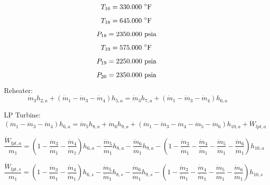 \documentclass{article}
\begin{document}
\begin{equation}
T_{16} =  330.000\textnormal{ \(^{\circ}\)F             }
\end{equation}

\begin{equation}
T_{18} =  645.000\textnormal{ \(^{\circ}\)F             }
\end{equation}

\begin{equation}
P_{18} = 2350.000\textnormal{ psia                      }
\end{equation}

\begin{equation}
T_{19} =  575.000\textnormal{ \(^{\circ}\)F             }
\end{equation}

\begin{equation}
P_{19} = 2250.000\textnormal{ psia                      }
\end{equation}

\begin{equation}
P_{20} = 2350.000\textnormal{ psia                      }
\end{equation}


Reheater:
\begin{equation}
\dot{m}_{ 3}h_{ 2,a} + (\dot{m}_{ 1} - \dot{m}_{ 3} - \dot{m}_{ 4})h_{ 5,a} = \dot{m}_{ 3}h_{ 7,a} + (\dot{m}_{ 1} - \dot{m}_{ 3} - \dot{m}_{ 4})h_{ 6,a}
\end{equation}


LP Turbine:
\begin{equation}
(\dot{m}_{ 1} - \dot{m}_{ 3} - \dot{m}_{ 4})h_{ 6,a} = \dot{m}_{ 5}h_{ 8,a} + \dot{m}_{ 6}h_{ 9,a} + (\dot{m}_{ 1} - \dot{m}_{ 3} - \dot{m}_{ 4} - \dot{m}_{ 5} - \dot{m}_{ 6})h_{10,a} + \dot{W}_{lpt,a}
\end{equation}

\begin{equation}
\frac{\dot{W}_{lpt,a}}{m_1} = (1 - \frac{\dot{m}_{ 3}}{\dot{m}_{ 1}} - \frac{\dot{m}_{ 4}}{\dot{m}_{ 1}})h_{ 6,a} - \frac{\dot{m}_{ 5}}{\dot{m}_{ 1}}h_{ 8,a} - \frac{\dot{m}_{ 6}}{\dot{m}_{ 1}}h_{ 9,a} - (1 - \frac{\dot{m}_{ 3}}{\dot{m}_{ 1}} - \frac{\dot{m}_{ 4}}{\dot{m}_{ 1}} - \frac{\dot{m}_{ 5}}{\dot{m}_{ 1}} - \frac{\dot{m}_{ 6}}{\dot{m}_{ 1}})h_{10,a}\end{equation}

\begin{equation}
\frac{\dot{W}_{lpt,s}}{m_1} = (1 - \frac{\dot{m}_{ 3}}{\dot{m}_{ 1}} - \frac{\dot{m}_{ 4}}{\dot{m}_{ 1}})h_{ 6,s} - \frac{\dot{m}_{ 5}}{\dot{m}_{ 1}}h_{ 8,s} - \frac{\dot{m}_{ 6}}{\dot{m}_{ 1}}h_{ 9,s} - (1 - \frac{\dot{m}_{ 3}}{\dot{m}_{ 1}} - \frac{\dot{m}_{ 4}}{\dot{m}_{ 1}} - \frac{\dot{m}_{ 5}}{\dot{m}_{ 1}} - \frac{\dot{m}_{ 6}}{\dot{m}_{ 1}})h_{10,s}\end{equation}
\end{document}
